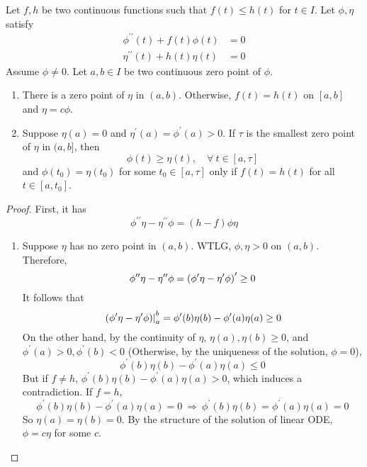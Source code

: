 \begin{enumerate}[label=\arabic{*}.]
	\begin{thm}[Sturm]
		Let $f,h$ be two continuous functions such that $f(t) \leq h(t)$ for $t \in I$. Let $\phi,\eta$ satisfy
		\begin{equation*}
			\begin{aligned}
				\phi^{\prime\prime}(t) + f(t) \phi(t) &= 0 \\
				\eta^{\prime\prime}(t) + h(t) \eta(t) &= 0
			\end{aligned}
		\end{equation*}
		Assume $\phi \neq 0$. Let $a,b \in I$ be two continuous zero point of $\phi$.
		\begin{enumerate}[label=(\arabic{*})]
			\item There is a zero point of $\eta$ in $(a,b)$. Otherwise, $f(t) = h(t)$ on $[a,b]$ and $\eta = c\phi$.
			\item Suppose $\eta(a) = 0$ and $\eta^\prime(a) = \phi^\prime(a) > 0$. If $\tau$ is the smallest zero point of $\eta$ in $(a,b]$, then
			\begin{equation*}
				\phi(t) \geq \eta(t),\quad \forall~t \in [a,\tau]
			\end{equation*}
			and $\phi(t_0) = \eta(t_0)$ for some $t_0 \in [a,\tau]$ only if $f(t) = h(t)$ for all $t \in [a,t_0]$.
		\end{enumerate}
	\end{thm}
	\begin{proof}
		First, it has
		\begin{equation*}
			\phi^{\prime\prime}\eta - \eta^{\prime\prime}\phi = (h-f)\phi\eta
		\end{equation*}
		\begin{enumerate}[label=(\arabic{*})]
			\item Suppose $\eta$ has no zero point in $(a,b)$. WTLG, $\phi,\eta > 0$ on $(a,b)$. Therefore,
			\begin{equation*}
				\phi^{\prime\prime}\eta - \eta^{\prime\prime}\phi = \left(\phi^{\prime}\eta - \eta^{\prime}\phi\right)^\prime \geq 0
			\end{equation*}
			It follows that
			\begin{equation*}
				\left.(\phi^{\prime}\eta - \eta^{\prime}\phi)\right\lvert_{a}^b = \phi^{\prime}(b)\eta(b) - \phi^{\prime}(a)\eta(a) \geq 0
			\end{equation*}
			On the other hand, by the continuity of $\eta$, $\eta(a),\eta(b) \geq 0$, and $\phi^{\prime}(a) > 0,\phi^{\prime}(b) < 0$ (Otherwise, by the uniqueness of the solution, $\phi = 0$),
			\begin{equation*}
				\phi^{\prime}(b)\eta(b) - \phi^{\prime}(a)\eta(a) \leq 0
			\end{equation*}
			But if $f \neq h$, $\phi^{\prime}(b)\eta(b) - \phi^{\prime}(a)\eta(a) > 0$, which induces a contradiction. If $f = h$, 
			\begin{equation*}
				\phi^{\prime}(b)\eta(b) - \phi^{\prime}(a)\eta(a) = 0 ~\Rightarrow~\phi^{\prime}(b)\eta(b) = \phi^{\prime}(a)\eta(a) = 0
			\end{equation*}
			So $\eta(a) = \eta(b) = 0$. By the structure of the solution of linear ODE, $\phi = c\eta$ for some $c$.


\end{enumerate}
\end{proof}
\end{enumerate}
